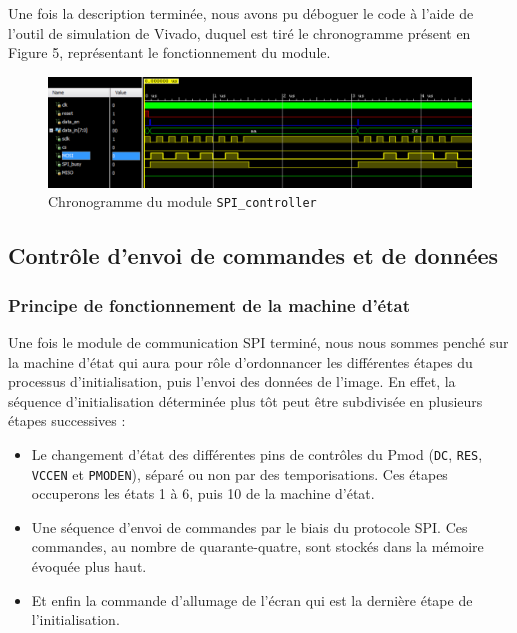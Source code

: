 \documentclass[11pt]{article}
\begin{document}
Une fois la description terminée, nous avons pu déboguer le code à l'aide de l'outil de simulation de Vivado, duquel est tiré le chronogramme présent en Figure 5, représentant le fonctionnement du module.

\begin{figure}[H]
\begin{center}
\includegraphics[scale = 0.3, keepaspectratio]{chrono_SPI_controller.png}
\caption{Chronogramme du module \texttt{SPI\_controller}}
\end{center}
\end{figure}

\subsection{Contrôle d'envoi de commandes et de données}

\subsubsection{Principe de fonctionnement de la machine d'état}

Une fois le module de communication SPI terminé, nous nous sommes penché sur la machine d'état qui aura pour rôle d'ordonnancer les différentes étapes du processus d'initialisation, puis l'envoi des données de l'image. En effet, la séquence d'initialisation déterminée plus tôt peut être subdivisée en plusieurs étapes successives :

\begin{itemize}

\item[\textbullet] Le changement d'état des différentes pins de contrôles du Pmod (\texttt{DC}, \texttt{RES}, \texttt{VCCEN} et \texttt{PMODEN}), séparé ou non par des temporisations. Ces étapes occuperons les états 1 à 6, puis 10 de la machine d'état.

\item[\textbullet] Une séquence d'envoi de commandes par le biais du protocole SPI. Ces commandes, au nombre de quarante-quatre, sont stockés dans la mémoire évoquée plus haut.

\item[\textbullet] Et enfin la commande d'allumage de l'écran qui est la dernière étape de l'initialisation.

\end{itemize}
\end{document}
